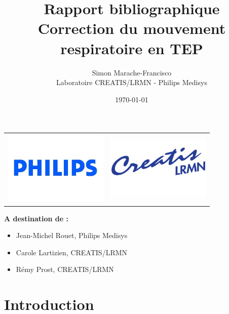 \documentclass[12pt]{book}
\title{\Huge{Rapport bibliographique}\\\Large{Correction du mouvement respiratoire en TEP}}
\author{
        \vspace{2cm}
        Simon Marache-Francisco \\
        Laboratoire CREATIS/LRMN - Philips Medisys\\
        \vspace{2cm}
}
\date{\today}
\begin{document}
\addtolength{\parskip}{0.5em}



\newcommand{\verrous}{\textbf{Verrous levés}}

\newcommand{\todo}[1]{
\addcontentsline{toc}{subsection}{\textbf{Todo:} #1}
$\|$\textbf{A Faire : }#1$\|$
}


\maketitle
\thispagestyle{empty}

\begin{center}
	\begin{tabular}{c c}
		\includegraphics[width=5cm]{images/logoPhilips} & \includegraphics[width=5cm]{images/logoCREATIS}
	\end{tabular}
\end{center}


\vfill

\textbf{A destination de :}
\begin{itemize}
    \item Jean-Michel Rouet, Philips Medisys
    \item Carole Lartizien, CREATIS/LRMN
    \item Rémy Prost, CREATIS/LRMN
\end{itemize}
\newpage

\tableofcontents


\part{Introduction}
\end{document}

